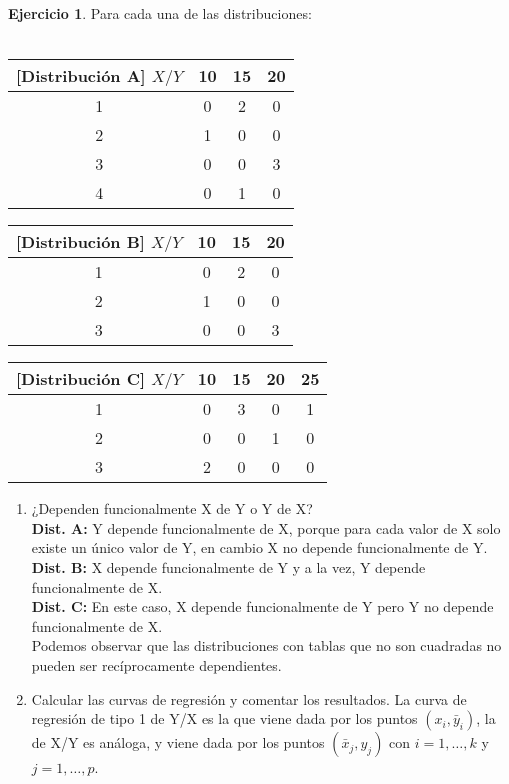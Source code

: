 \documentclass[a4paper, 12pt]{article}
\theoremstyle{definition}
\newtheorem{ej}{Ejercicio}
\begin{document}
\begin{ej}
Para cada una de las distribuciones:
\\
\\

\begin{center}
\begin{tabular}{c|ccc}[Distribución A]
	\(X/Y\) & 10 & 15 & 20 \\
	\hline
	1 & 0 & 2 & 0 \\
	2 & 1 & 0 & 0 \\
	3 & 0 & 0 & 3 \\
	4 & 0 & 1 & 0 \\
\end{tabular}  
\end{center}

\begin{center}
\begin{tabular}{c|ccc}[Distribución B]
	\(X/Y\) & 10 & 15 & 20 \\
	\hline
	1 & 0 & 2 & 0 \\
	2 & 1 & 0 & 0 \\
	3 & 0 & 0 & 3 \\
\end{tabular}
 \end{center}
 
 \begin{center}
\begin{tabular}{c|cccc}[Distribución C]
	\(X/Y\) & 10 & 15 & 20 & 25 \\
	\hline
	1 & 0 & 3 & 0 & 1 \\
	2 & 0 & 0 & 1 & 0 \\
	3 & 2 & 0 & 0 & 0 \\
\end{tabular}
\end{center}
\begin{enumerate}
    \item[a) ] ¿Dependen funcionalmente X de Y o Y de X? 
    \\
    \textbf{Dist. A:} Y depende funcionalmente de X, porque para cada valor de X solo existe un único valor de Y, en cambio X no depende funcionalmente de Y. \\
    \textbf{Dist. B:} X depende funcionalmente de Y y a la vez, Y depende funcionalmente de X. \\
    \textbf{Dist. C:} En este caso, X depende funcionalmente de Y pero Y no depende funcionalmente de X.
    \\
    Podemos observar que las distribuciones con tablas que no son cuadradas no pueden ser recíprocamente dependientes.
    \item[b) ] Calcular las curvas de regresión y comentar los resultados.
    La curva de regresión de tipo 1 de Y/X es la que viene dada por los puntos $(x_i, \bar{y}_i)$, la de X/Y es análoga, y viene dada por los puntos $(\bar{x}_j,y_j)$ con $i = 1, \dots , k$ y  $j = 1, \dots , p$.
   

\end{enumerate}
\end{ej}
\end{document}
